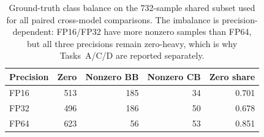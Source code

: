 \begin{table}[t]
  \centering
  \caption{Ground-truth class balance on the 732-sample shared subset used for all paired cross-model comparisons. The imbalance is precision-dependent: FP16/FP32 have more nonzero samples than FP64, but all three precisions remain zero-heavy, which is why Tasks~A/C/D are reported separately.}
  \label{tab:shared-class-balance}
  \scriptsize
  \setlength{\tabcolsep}{4pt}
  \begin{tabular}{lrrrr}
    Precision & Zero & Nonzero BB & Nonzero CB & Zero share \\
    \midrule
    FP16 & 513 & 185 & 34 & 0.701 \\
    FP32 & 496 & 186 & 50 & 0.678 \\
    FP64 & 623 & 56 & 53 & 0.851 \\
    \bottomrule
  \end{tabular}
\end{table}

